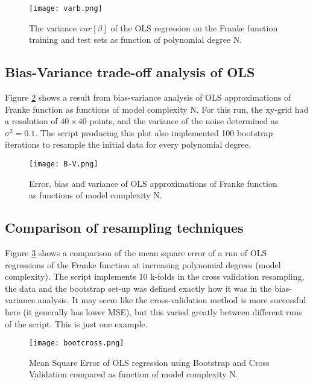 \documentclass[reprint,english,notitlepage]{revtex4-1}  %
\begin{document}
\begin{figure}[h!]
    \centering
    \texttt{[image: varb.png]}
    \caption{The variance $var[\beta]$ of the OLS regression on the Franke function training and test sets as function of polynomial degree N.}
    \label{fig:varb}
\end{figure}

\subsection{Bias-Variance trade-off analysis of OLS}

Figure \ref{fig:bias} shows a result from bias-variance analysis of OLS approximations of Franke function as functions of model complexity N. For this run, the xy-grid had a resolution of $40\times 40$ points, and the variance of the noise determined as $\sigma^2 = 0.1$. The script producing this plot also implemented 100 bootstrap iterations to resample the initial data for every polynomial degree.

\begin{figure}[h!]
    \centering
    \texttt{[image: B-V.png]}
    \caption{Error, bias and variance of OLS approximations of Franke function as functions of model complexity N.}
    \label{fig:bias}
\end{figure}

\subsection{Comparison of resampling techniques}

Figure  \ref{fig:crossboot} shows a comparison of the mean square error of a run of OLS regressions of the Franke function at increasing polynomial degrees (model complexity). The script implements 10 k-folds in the cross validation resampling, the data and the bootstrap set-up was defined exactly how it was in the bias-variance analysis. It may seem like the cross-validation method is more successful here (it generally has lower MSE), but this varied greatly between different runs of the script. This is just one example.

\begin{figure}[h!]
    \centering
    \texttt{[image: bootcross.png]}
    \caption{Mean Square Error of OLS regression using Bootstrap and Cross Validation compared as function of model complexity N.}
    \label{fig:crossboot}
\end{figure}
\end{document}
